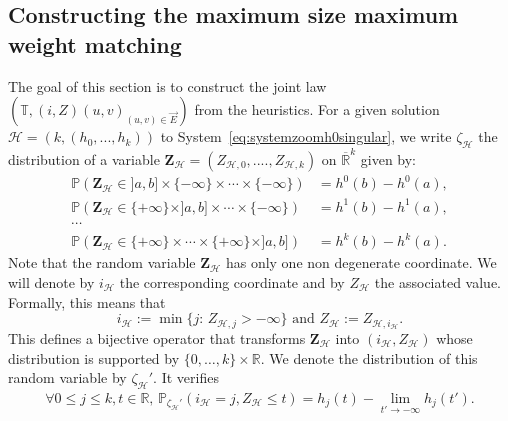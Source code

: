 \documentclass[11pt]{article}
\begin{document}
\subsection{Constructing the maximum size maximum weight matching}
The goal of this section is to construct the joint law $(\mathbb{T}, (i,Z)(u,v)_{(u,v)\in\overset{\rightarrow}{E}})$ from the heuristics. For a given solution $\mathcal{H}=(k,(h_0,...,h_k))$ to System~\eqref{eq:systemzoomh0singular}, we write $\zeta_\mathcal{H}$ the distribution of a variable $\mathbf{Z}_{\mathcal{H}}=(Z_{\mathcal{H},0},....,Z_{\mathcal{H},k})$ on $\overline{\mathbb{R}}^k$ given by:
\begin{equation}\label{eq:zetatranslation}
\begin{aligned}
    \mathbb{P}( \mathbf{Z}_\mathcal{H} \in ]a,b] \times \{ -\infty \} \times \cdots \times \{ -\infty \} )&= h^0(b)-h^0(a), \\
    \mathbb{P}( \mathbf{Z}_\mathcal{H} \in \{ + \infty \} \times ]a,b] \times \cdots \times \{ -\infty \} )&= h^{1}(b)-h^{1}(a), \\
    \cdots \\
    \mathbb{P}( \mathbf{Z}_\mathcal{H} \in \{ +\infty \}  \times \cdots \times \{ +\infty \} \times ]a,b] )&= h^k(b)-h^k(a).
\end{aligned}
\end{equation}
Note that the random variable $
\mathbf{Z}_{\mathcal{H}}$ has only one non degenerate coordinate. We will denote by $i_{\mathcal{H}}$ the corresponding coordinate and by $Z_\mathcal{H}$ the associated value. Formally, this means that
\[
i_{\mathcal{H}} := \min \{ j :\, Z_{\mathcal{H},j} > - \infty \}
\text{ and }
Z_{\mathcal{H}} := Z_{\mathcal{H},i_\mathcal{H}}.
\]
This defines a bijective operator that transforms $\mathbf{Z}_\mathcal{H}$ into $(i_\mathcal{H},Z_\mathcal{H})$ whose distribution is supported by $\{0,\ldots ,k\} \times \mathbb{R}$.
We denote the distribution of this random variable by $\zeta_{\mathcal{H}}'$. It verifies
\begin{align}\label{eq:zeta'translation}
    \forall 0 \leq j \leq k, t \in \mathbb{R}, \, \mathbb{P}_{\zeta_\mathcal{H}'} \left( 
i_\mathcal{H}=j, Z_\mathcal{H} \leq t\right)=h_j(t)-\lim_{t' \rightarrow -\infty}h_j(t').
\end{align}

\bigskip
\end{document}
